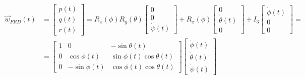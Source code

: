 \begin{equation}
    \label{eq:EulerotoVelocitaAngolare}
    \begin{split}
        \vec{w}_{FRD}(t) & = \begin{bmatrix}
                                 p(t) \\
                                 q(t) \\
                                 r(t)
                             \end{bmatrix} = R_{x}(\phi)R_{y}(\theta) \begin{bmatrix}
                                                                          0 \\
                                                                          0 \\
                                                                          \dot{\psi}(t)
                                                                      \end{bmatrix} + R_{x}(\phi) \begin{bmatrix}
                                                                                                      0               \\
                                                                                                      \dot{\theta}(t) \\
                                                                                                      0
                                                                                                  \end{bmatrix} + I_3 \begin{bmatrix}
                                                                                                                          \dot{\phi}(t) \\
                                                                                                                          0             \\
                                                                                                                          0
                                                                                                                      \end{bmatrix} =
        \\ & = \begin{bmatrix}
            1 & 0            & -\sin\theta(t)           \\
            0 & \cos\phi(t)  & \sin\phi(t)\cos\theta(t) \\
            0 & -\sin\phi(t) & \cos\phi(t)\cos\theta(t)
        \end{bmatrix}\begin{bmatrix}
            \dot{\phi}(t)   \\
            \dot{\theta}(t) \\
            \dot{\psi}(t)
        \end{bmatrix}
    \end{split}
\end{equation}

